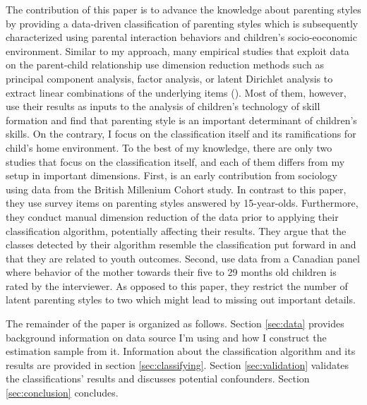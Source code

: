 The contribution of this paper is to advance the knowledge about parenting styles by providing a data-driven classification of parenting styles which is subsequently characterized using parental interaction behaviors and children's socio-eoconomic environment. Similar to my approach, many empirical studies that exploit data on the parent-child relationship use dimension reduction methods such as principal component analysis, factor analysis, or latent Dirichlet analysis to extract linear combinations of the underlying items (\cite{ermischOriginsSocialImmobility2008, chanParentingStyleYouth2011, fioriniHowAllocationChildren2014, bonoEarlyMaternalTime2016, cobb-clarkParentingStyleInvestment2019, zumbuehlParentalInvolvementIntergenerational2020, rauhParentingTypes2020}). Most of them, however, use their results as inputs to the analysis of children's technology of skill formation and find that parenting style is an important determinant of children's skills. On the contrary, I focus on the classification itself and its ramifications for child's home environment. To the best of my knowledge, there are only two studies that focus on the classification itself, and each of them differs from my setup in important dimensions. First, \textcite{chanParentingStyleYouth2011} is an early contribution from sociology using data from the British Millenium Cohort study. In contrast to this paper, they use survey items on parenting styles answered by 15-year-olds. Furthermore, they conduct manual dimension reduction of the data prior to applying their classification algorithm, potentially affecting their results. They argue that the classes detected by their algorithm resemble the classification put forward in \textcite{baumrindChildCarePractices1967} and that they are related to youth outcomes. Second, \textcite{rauhParentingTypes2020} use data from a Canadian panel where behavior of the mother towards their five to 29 months old children is rated by the interviewer. As opposed to this paper, they restrict the number of latent parenting styles to two which might lead to missing out important details.

The remainder of the paper is organized as follows. Section \ref{sec:data} provides background information on data source I'm using and how I construct the estimation sample from it. Information about the classification algorithm and its results are provided in section \ref{sec:classifying}. Section \ref{sec:validation} validates the classifications' results and discusses potential confounders. Section \ref{sec:conclusion} concludes.


